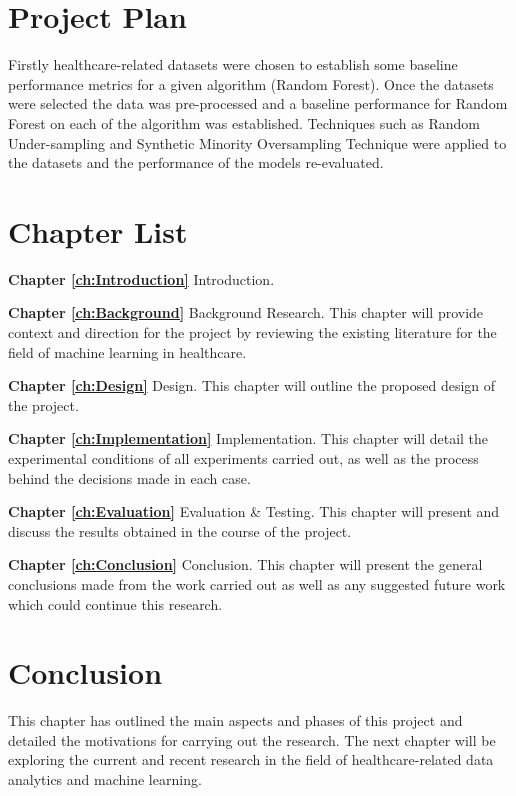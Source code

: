 \section{Project Plan}
Firstly healthcare-related datasets were chosen to establish some baseline performance metrics for a given algorithm (Random Forest). Once the datasets were selected the data was pre-processed and a baseline performance for Random Forest on each of the algorithm was established.\newline
Techniques such as Random Under-sampling and Synthetic Minority Oversampling Technique were applied to the datasets and the performance of the models re-evaluated.\newline

\section{Chapter List}

\textbf{Chapter \ref{ch:Introduction}} Introduction. 

\textbf{Chapter \ref{ch:Background}} Background Research.\newline
This chapter will provide context and direction for the project by reviewing the existing literature for the field of machine learning in healthcare.\newline


\textbf{Chapter \ref{ch:Design}} Design.\newline
This chapter will outline the proposed design of the project.\newline


\textbf{Chapter \ref{ch:Implementation}} Implementation.\newline
This chapter will detail the experimental conditions of all experiments carried out, as well as the process behind the decisions made in each case.\newline

\textbf{Chapter \ref{ch:Evaluation}} Evaluation \& Testing.\newline
This chapter will present and discuss the results obtained in the course of the project.\newline

\textbf{Chapter \ref{ch:Conclusion}} Conclusion. \newline
This chapter will present the general conclusions made from the work carried out as well as any suggested future work which could continue this research.

\section{Conclusion}
This chapter has outlined the main aspects and phases of this project and detailed the motivations for carrying out the research. 
The next chapter will be exploring the current and recent research in the field of healthcare-related data analytics and machine learning.
